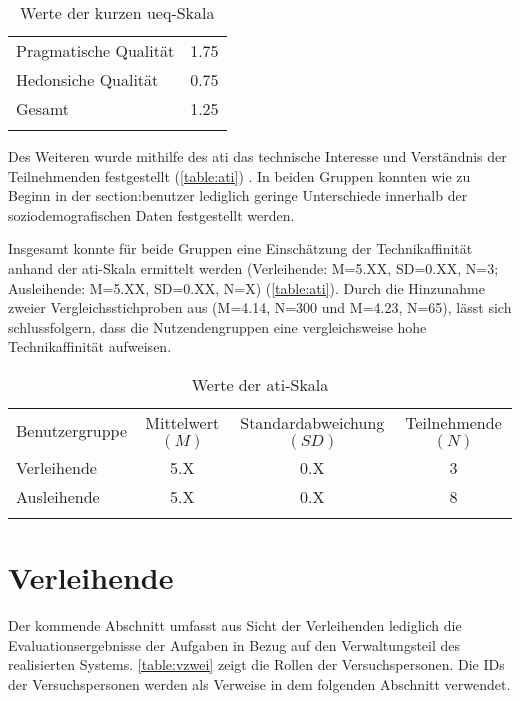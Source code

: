 \begin{table}[h]
  \centering
  \caption{Werte der kurzen \ac{ueq}-Skala}
  \begin{tabular}{lc}
    \arrayrulecolor{maincolor}\hline
    Pragmatische Qualität & 1.75 \\
    Hedonsiche Qualität   & 0.75 \\
    Gesamt                & 1.25 \\
    \arrayrulecolor{maincolor}\hline
  \end{tabular}
  \label{table:ueq}
\end{table}

Des Weiteren wurde mithilfe des \ac{ati} das technische Interesse und
Verständnis der Teilnehmenden festgestellt (\ref{table:ati})
\cite{attig_assessing_2017}. In beiden Gruppen konnten wie zu Beginn in der
\refname{section:benutzer} lediglich geringe Unterschiede innerhalb der
soziodemografischen Daten festgestellt werden.

Insgesamt konnte für beide Gruppen eine Einschätzung der Technikaffinität anhand
der \ac{ati}-Skala ermittelt werden (Verleihende: M=5.XX, SD=0.XX, N=3;
Ausleihende: M=5.XX, SD=0.XX, N=X) (\ref{table:ati}). Durch die Hinzunahme
zweier Vergleichsstichproben aus  (M=4.14, N=300 und
M=4.23, N=65), lässt sich schlussfolgern, dass die Nutzendengruppen eine
vergleichsweise hohe Technikaffinität aufweisen.


\begin{table}[h]
  \centering
  \caption{Werte der \ac{ati}-Skala}
  \begin{tabular}{lccc}
    \arrayrulecolor{maincolor}\hline
    \sffamily\color{maincolor}Benutzergruppe            &
    \sffamily\color{maincolor}Mittelwert $(M)$          &
    \sffamily\color{maincolor}Standardabweichung $(SD)$ &
    \sffamily\color{maincolor}Teilnehmende $(N)$                        \\
    \arrayrulecolor{maincolor}\hline
    Verleihende                                         & 5.X & 0.X & 3 \\
    Ausleihende                                         & 5.X & 0.X & 8 \\
    \arrayrulecolor{maincolor}\hline
  \end{tabular}
  \label{table:atipartzwei}
\end{table}


\section{Verleihende}
Der kommende Abschnitt umfasst aus Sicht der Verleihenden lediglich die Evaluationsergebnisse der
Aufgaben in Bezug auf den Verwaltungsteil des realisierten Systems.
\ref{table:vzwei} zeigt die Rollen der Versuchspersonen. Die IDs der Versuchspersonen werden als
Verweise in dem folgenden Abschnitt verwendet.

